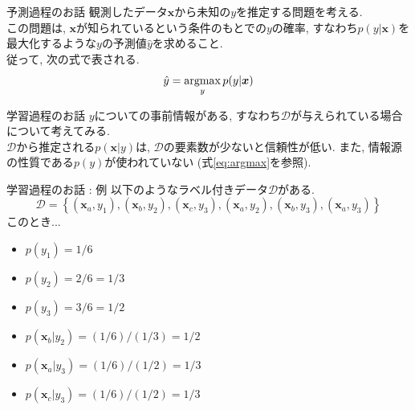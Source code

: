 \documentclass[aspectratio=43, dvipdfmx, 12pt]{beamer}
\newcommand{\vek}[1]{\bm{#1}} %
\newcommand{\argmax}{\mathop{\rm argmax}\limits} %
\begin{document}
\begin{frame}{予測過程のお話}
  観測したデータ$\vek{x}$から未知の$y$を推定する問題を考える.\\
  この問題は, $\vek{x}$が知られているという条件のもとでの$y$の確率,
  すなわち$p(y|\vek{x})$を最大化するような$y$の予測値$\hat{y}$を求めること.\\
  従って, 次の式で表される. 
  \begin{equation}
    \label{eq:argmax}
    \hat{y} = \argmax_{y}p(y|\vek{x})
  \end{equation}
\end{frame}

\begin{frame}{学習過程のお話}
  $y$についての事前情報がある, すなわち$\mathcal{D}$が与えられている場合について考えてみる. \\
  $\mathcal{D}$から推定される$p(\vek{x}|y)$は, $\mathcal{D}$の要素数が少ないと信頼性が低い. また, 情報源の性質である$p(y)$が使われていない (式\ref{eq:argmax}を参照).
\end{frame}

\begin{frame}{学習過程のお話 : 例}
  以下のようなラベル付きデータ$\mathcal{D}$がある.
  \[
    \mathcal{D} = \left\{ (\vek{x}_{a}, y_{1}), (\vek{x}_{b}, y_{2}), (\vek{x}_{c}, y_{3}), (\vek{x}_{a}, y_{2}), (\vek{x}_{b}, y_{3}), (\vek{x}_{a}, y_{3}) \right\}
  \]
  このとき...
  \begin{itemize}
    \item $p(y_{1}) = 1/6$
    \item $p(y_{2}) = 2/6 = 1/3$
    \item $p(y_{3}) = 3/6 = 1/2$
    \item $p(\vek{x}_{b}|y_{2}) = (1/6)/(1/3) = 1/2$
    \item $p(\vek{x}_{a}|y_{3}) = (1/6)/(1/2) = 1/3$
    \item $p(\vek{x}_{c}|y_{3}) = (1/6)/(1/2) = 1/3$
  \end{itemize}
\end{frame}
\end{document}
